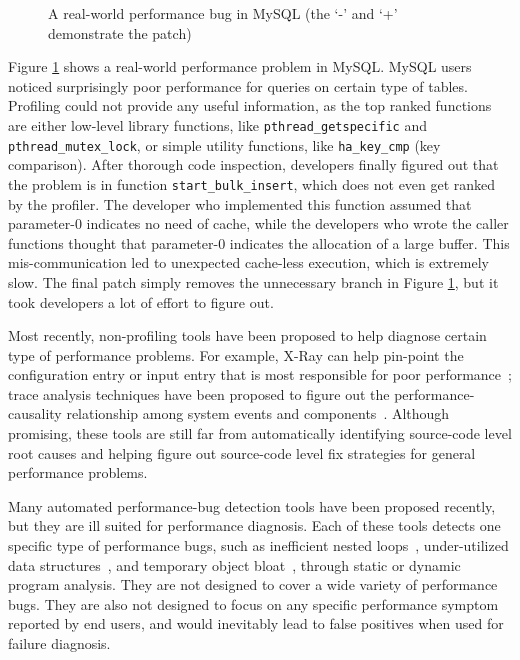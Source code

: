 \begin{figure}
\caption{A real-world performance bug in MySQL (the `-' and `+' demonstrate the patch)}
\label{fig:MySQLintro}
\end{figure}


%


Figure \ref{fig:MySQLintro}
shows a real-world performance problem in MySQL. MySQL users noticed 
surprisingly poor performance for queries on certain type of tables.
Profiling could not
provide any useful information, as the top ranked
functions are either low-level library functions, like 
\texttt{pthread\_getspecific} and \texttt{pthread\_mutex\_lock}, or simple 
utility
functions, like \texttt{ha\_key\_cmp} (key comparison). 
After thorough code inspection, developers finally figured
out that the problem is in function \texttt{start\_bulk\_insert}, which does
not even get ranked by the profiler.
The developer who implemented this
function assumed that parameter-0 indicates no need of cache, while the 
developers who 
wrote the caller functions thought that parameter-0 indicates the allocation of a
large buffer. This mis-communication led to unexpected cache-less execution, 
which is extremely slow. The final patch simply removes the unnecessary
branch in Figure \ref{fig:MySQLintro}, but it took developers a lot of 
effort to figure out. 

Most recently, non-profiling tools have been proposed to help diagnose certain
type of performance problems. For example, X-Ray can help pin-point the 
configuration entry or input entry that is most responsible for poor 
performance~\citep{XRayOSDI}; trace analysis
techniques have been proposed to figure out the performance-causality 
relationship among system events and components~\citep{TaoAsplos2014,amertrace}. 
Although promising, these tools are still
far from automatically identifying
source-code level root causes and helping figure out
source-code level fix
strategies for general performance problems.

Many automated performance-bug detection tools have been proposed recently,
but they are ill suited for performance diagnosis.
Each of these tools detects one specific type of performance bugs,
such as inefficient nested loops~\citep{Alabama}, under-utilized data 
structures~\citep{XuDataStructure}, 
and temporary object bloat~\citep{BloatFSE2008, XuBloatPLDI2009, XuBloatPLDI2010},
through static or dynamic program analysis. They are not designed to cover a wide variety
of performance bugs. They are also not designed to focus on any specific
performance symptom reported by end users, and would inevitably lead to false 
positives when
used for failure diagnosis.


